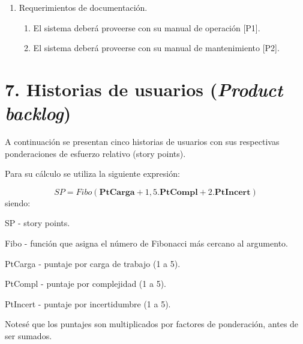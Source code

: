 \documentclass[
11pt, %
codirector, %
]{charter}
\begin{document}
\begin{enumerate}
\item Requerimientos de documentación.
\begin{enumerate}
\item El sistema deberá proveerse con su manual de operación [P1].
\item El sistema deberá proveerse con su manual de mantenimiento [P2]. 
\end{enumerate}		


\end{enumerate}

\section{7. Historias de usuarios (\textit{Product backlog})}
\label{sec:backlog}

A continuación se presentan cinco historias de usuarios con sus respectivas ponderaciones de esfuerzo relativo (story points).

Para su cálculo se utiliza la siguiente expresión:

\begin{equation}
SP = Fibo (\textbf{PtCarga} + 1,5.\textbf{PtCompl} + 2.\textbf{PtIncert})
\end{equation}
siendo:

SP - story points.

Fibo - función que asigna el número de Fibonacci más cercano al argumento.

PtCarga - puntaje por carga de trabajo (1 a 5).

PtCompl - puntaje por complejidad (1 a 5).

PtIncert - puntaje por incertidumbre (1 a 5).

Notesé que los puntajes son multiplicados por factores de ponderación, antes de ser sumados.
\end{document}
